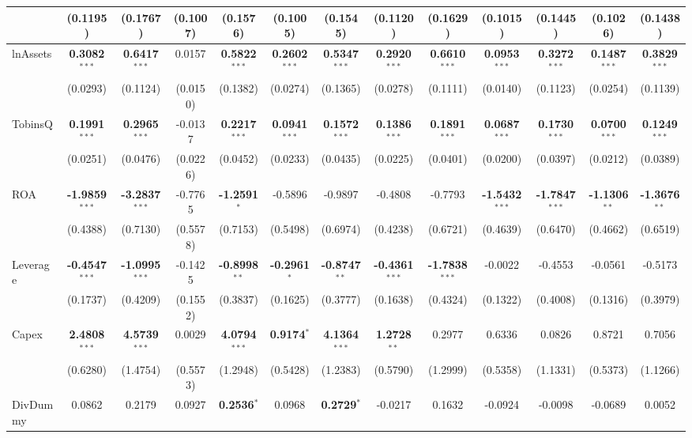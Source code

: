 \documentclass[11pt,a4paper]{article}
\begin{document}
\begin{table}[htbp]
\begin{tabular}{lcccccccccccc}
 & (0.1195) & (0.1767) & (0.1007) & (0.1576) & (0.1005) & (0.1545) & (0.1120) & (0.1629) & (0.1015) & (0.1445) & (0.1026) & (0.1438) \\
\midrule
lnAssets & \textbf{0.3082}$^{***}$ & \textbf{0.6417}$^{***}$ & 0.0157 & \textbf{0.5822}$^{***}$ & \textbf{0.2602}$^{***}$ & \textbf{0.5347}$^{***}$ & \textbf{0.2920}$^{***}$ & \textbf{0.6610}$^{***}$ & \textbf{0.0953}$^{***}$ & \textbf{0.3272}$^{***}$ & \textbf{0.1487}$^{***}$ & \textbf{0.3829}$^{***}$ \\
 & (0.0293) & (0.1124) & (0.0150) & (0.1382) & (0.0274) & (0.1365) & (0.0278) & (0.1111) & (0.0140) & (0.1123) & (0.0254) & (0.1139) \\
TobinsQ & \textbf{0.1991}$^{***}$ & \textbf{0.2965}$^{***}$ & -0.0137 & \textbf{0.2217}$^{***}$ & \textbf{0.0941}$^{***}$ & \textbf{0.1572}$^{***}$ & \textbf{0.1386}$^{***}$ & \textbf{0.1891}$^{***}$ & \textbf{0.0687}$^{***}$ & \textbf{0.1730}$^{***}$ & \textbf{0.0700}$^{***}$ & \textbf{0.1249}$^{***}$ \\
 & (0.0251) & (0.0476) & (0.0226) & (0.0452) & (0.0233) & (0.0435) & (0.0225) & (0.0401) & (0.0200) & (0.0397) & (0.0212) & (0.0389) \\
ROA & \textbf{-1.9859}$^{***}$ & \textbf{-3.2837}$^{***}$ & -0.7765 & \textbf{-1.2591}$^{*}$ & -0.5896 & -0.9897 & -0.4808 & -0.7793 & \textbf{-1.5432}$^{***}$ & \textbf{-1.7847}$^{***}$ & \textbf{-1.1306}$^{**}$ & \textbf{-1.3676}$^{**}$ \\
 & (0.4388) & (0.7130) & (0.5578) & (0.7153) & (0.5498) & (0.6974) & (0.4238) & (0.6721) & (0.4639) & (0.6470) & (0.4662) & (0.6519) \\
Leverage & \textbf{-0.4547}$^{***}$ & \textbf{-1.0995}$^{***}$ & -0.1425 & \textbf{-0.8998}$^{**}$ & \textbf{-0.2961}$^{*}$ & \textbf{-0.8747}$^{**}$ & \textbf{-0.4361}$^{***}$ & \textbf{-1.7838}$^{***}$ & -0.0022 & -0.4553 & -0.0561 & -0.5173 \\
 & (0.1737) & (0.4209) & (0.1552) & (0.3837) & (0.1625) & (0.3777) & (0.1638) & (0.4324) & (0.1322) & (0.4008) & (0.1316) & (0.3979) \\
Capex & \textbf{2.4808}$^{***}$ & \textbf{4.5739}$^{***}$ & 0.0029 & \textbf{4.0794}$^{***}$ & \textbf{0.9174}$^{*}$ & \textbf{4.1364}$^{***}$ & \textbf{1.2728}$^{**}$ & 0.2977 & 0.6336 & 0.0826 & 0.8721 & 0.7056 \\
 & (0.6280) & (1.4754) & (0.5573) & (1.2948) & (0.5428) & (1.2383) & (0.5790) & (1.2999) & (0.5358) & (1.1331) & (0.5373) & (1.1266) \\
DivDummy & 0.0862 & 0.2179 & 0.0927 & \textbf{0.2536}$^{*}$ & 0.0968 & \textbf{0.2729}$^{*}$ & -0.0217 & 0.1632 & -0.0924 & -0.0098 & -0.0689 & 0.0052 \\

\end{tabular}
\end{table}
\end{document}
